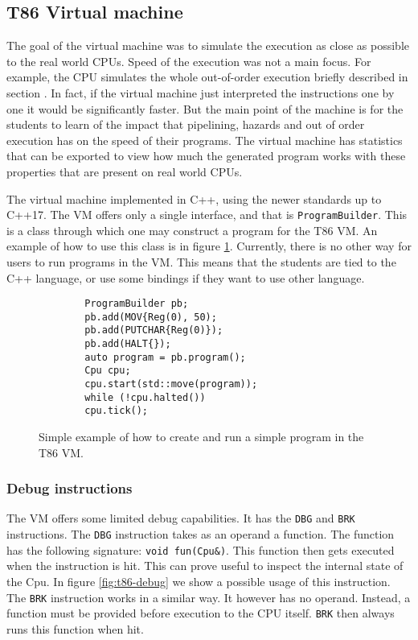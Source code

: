 \subsection{T86 Virtual machine}
The goal of the virtual machine was to simulate the execution as close as
possible to the real world CPUs. Speed of the execution was not a main focus.
For example, the CPU simulates the whole out-of-order execution briefly
described in section . In fact, if the virtual machine just
interpreted the instructions one by one it would be significantly faster. But
the main point of the machine is for the students to learn of the impact that
pipelining, hazards and out of order execution has on the speed of their
programs. The virtual machine has statistics that can be exported to view how
much the generated program works with these properties that are present on real
world CPUs.

The virtual machine implemented in C++, using the newer standards up to C++17.
The VM offers only a single interface, and that is \texttt{ProgramBuilder}.
This is a class through which one may construct a program for the T86 VM.
An example of how to use this class is in figure \ref{fig:t86-intro}.
Currently, there is no other way for users to run programs in the VM.
This means that the students are tied to the C++ language, or use
some bindings if they want to use other language.

\begin{figure}
    \begin{verbatim}
        ProgramBuilder pb;
        pb.add(MOV{Reg(0), 50);
        pb.add(PUTCHAR{Reg(0)});
        pb.add(HALT{});
        auto program = pb.program();
        Cpu cpu;
        cpu.start(std::move(program));
        while (!cpu.halted())
        cpu.tick();
    \end{verbatim}
    \caption{Simple example of how to create and run a simple program in the T86 VM.}
    \label{fig:t86-intro}
\end{figure}

\subsubsection*{Debug instructions}
The VM offers some limited debug capabilities. It has the \texttt{DBG} and
\texttt{BRK} instructions. The \texttt{DBG} instruction takes as an operand a
function. The function has the following signature: \texttt{void fun(Cpu\&)}.
This function then gets executed when the instruction is hit. This can prove
useful to inspect the internal state of the Cpu. In figure \ref{fig:t86-debug}
we show a possible usage of this instruction. The \texttt{BRK} instruction
works in a similar way. It however has no operand. Instead, a function must be
provided before execution to the CPU itself. \texttt{BRK} then always runs this
function when hit.

